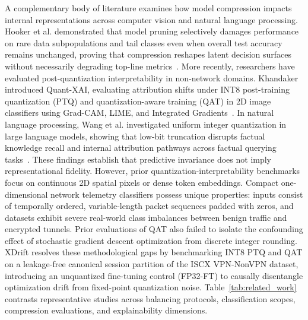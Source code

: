 \documentclass[conference]{IEEEtran}
\begin{document}
A complementary body of literature examines how model compression impacts internal representations across computer vision and natural language processing. Hooker et al. demonstrated that model pruning selectively damages performance on rare data subpopulations and tail classes even when overall test accuracy remains unchanged, proving that compression reshapes latent decision surfaces without necessarily degrading top-line metrics~\cite{b6}. More recently, researchers have evaluated post-quantization interpretability in non-network domains. Khandaker introduced Quant-XAI, evaluating attribution shifts under INT8 post-training quantization (PTQ) and quantization-aware training (QAT) in 2D image classifiers using Grad-CAM, LIME, and Integrated Gradients~\cite{b18}. In natural language processing, Wang et al. investigated uniform integer quantization in large language models, showing that low-bit truncation disrupts factual knowledge recall and internal attribution pathways across factual querying tasks~\cite{b19}. These findings establish that predictive invariance does not imply representational fidelity. However, prior quantization-interpretability benchmarks focus on continuous 2D spatial pixels or dense token embeddings. Compact one-dimensional network telemetry classifiers possess unique properties: inputs consist of temporally ordered, variable-length packet sequences padded with zeros, and datasets exhibit severe real-world class imbalances between benign traffic and encrypted tunnels. Prior evaluations of QAT also failed to isolate the confounding effect of stochastic gradient descent optimization from discrete integer rounding. XDrift resolves these methodological gaps by benchmarking INT8 PTQ and QAT on a leakage-free canonical session partition of the ISCX VPN-NonVPN dataset, introducing an unquantized fine-tuning control (FP32-FT) to causally disentangle optimization drift from fixed-point quantization noise. Table~\ref{tab:related_work} contrasts representative studies across balancing protocols, classification scopes, compression evaluations, and explainability dimensions.
\end{document}
